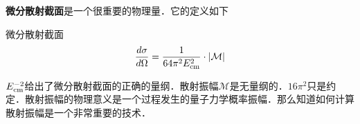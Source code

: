 \textbf{微分散射截面}是一个很重要的物理量．它的定义如下
\begin{definition}{微分散射截面}
\begin{equation}
\frac{d\sigma}{d\Omega} = \frac{1}{64\pi^2E_{\rm cm}^2}\cdot |\mathcal M|
\end{equation}
\end{definition}
$E_{\rm cm}^{-2}$给出了微分散射截面的正确的量纲．散射振幅$\mathcal M$是无量纲的．$16\pi^2$只是约定．散射振幅的物理意义是一个过程发生的量子力学概率振幅．那么知道如何计算散射振幅是一个非常重要的技术．















